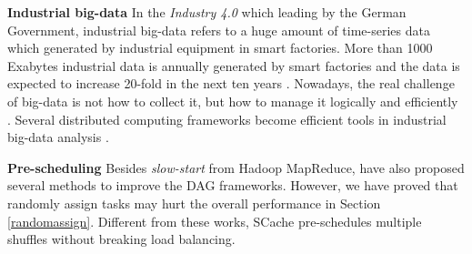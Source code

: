 {\textbf{Industrial big-data}
In the \textit{Industry 4.0} which leading by the German Government, industrial big-data refers to a huge amount of time-series data which generated by industrial equipment in smart factories.
More than 1000 Exabytes industrial data is annually generated by smart factories and the data is expected to increase 20-fold in the next ten years \cite{yin2015big}.
Nowadays, the real challenge of big-data is not how to collect it, but how to manage it logically and efficiently \cite{lv2017next}.
Several distributed computing frameworks become efficient tools in industrial big-data analysis \cite{lade2017manufacturing, li2016scientific, ur2018big}.
}


\textbf{Pre-scheduling} 
Besides \textit{slow-start} from Hadoop MapReduce, \cite{starfish, ihadoop, guo2017ishuffle, dynmr} have also proposed several methods to improve the DAG frameworks.
However, we have proved that randomly assign tasks may hurt the overall performance in Section \ref{randomassign}. 
Different from these works, SCache pre-schedules multiple shuffles without breaking load balancing. 



